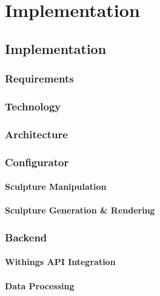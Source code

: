 \chapter{Implementation}
\label{ch:conf}

\section{Implementation}
\subsection{Requirements}
\subsection{Technology}
\subsection{Architecture}
\subsection{Configurator}
\subsubsection{Sculpture Manipulation}
\subsubsection{Sculpture Generation \& Rendering}
\subsection{Backend}
\subsubsection{Withings API Integration}
\subsubsection{Data Processing}
